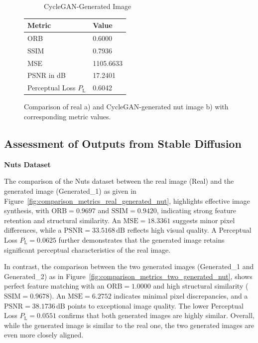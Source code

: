 \documentclass[12pt,DIV14,BCOR12mm,a4paper,footinclude=false,headinclude,parskip=half-,twoside,openright,cleardoublepage=empty,toc=index,bibliography=totoc,listof=totoc]{scrreprt}
\numberwithin{equation}{chapter}
\begin{document}
\begin{figure}
\begin{minipage}[H]{\linewidth}
\begin{minipage}[H]{0.5\linewidth}
\begin{subfigure}[t]{0.48\linewidth}
                \caption{CycleGAN-Generated Image}
            \end{subfigure}
        \end{minipage}%
        \hfill
        \begin{minipage}[H]{0.5\linewidth} %
            \centering
            \small
            \begin{tabular}{p{3cm} p{2cm}}
                \toprule
                \textbf{Metric} & \textbf{Value} \\ 
                \midrule
                ORB             & 0.6000        \\ 
                SSIM            & 0.7936        \\ 
                MSE             & 1105.6633     \\ 
                PSNR in dB      & 17.2401       \\ 
                Perceptual Loss \( P_{\text{L}} \)  & 0.6042        \\ 
                \bottomrule
            \end{tabular}
        \end{minipage}%
        \caption{Comparison of real a) and CycleGAN-generated nut image b) with corresponding metric values.}
        \label{fig:comparison_metrics_real_generated_nut_cycleGAN}
    \end{minipage}
\end{figure}

\subsection{Assessment of Outputs from Stable Diffusion}

\textbf{Nuts Dataset}

The comparison of the Nuts dataset between the real image (Real) and the generated image (Generated\_1) as given in Figure~\ref{fig:comparison_metrics_real_generated_nut}, highlights effective image synthesis, with $\text{ORB} = 0.9697$ and $\text{SSIM} = 0.9420$, indicating strong feature retention and structural similarity. An $\text{MSE} = 18.3361$ suggests minor pixel differences, while a $\text{PSNR} = 33.5168\,\mathrm{dB}$ reflects high visual quality. A Perceptual Loss \( P_{\text{L}} = 0.0625 \) further demonstrates that the generated image retains significant perceptual characteristics of the real image.

In contrast, the comparison between the two generated images (Generated\_1 and Generated\_2) as in Figure~\ref{fig:comparison_metrics_two_generated_nut}, shows perfect feature matching with an $\text{ORB} = 1.0000$ and high structural similarity ($\text{SSIM} = 0.9678$). An $\text{MSE} = 6.2752$ indicates minimal pixel discrepancies, and a $\text{PSNR} = 38.1736\,\mathrm{dB}$ points to exceptional image quality. The lower Perceptual Loss \( P_{\text{L}} = 0.0551 \) confirms that both generated images are highly similar. Overall, while the generated image is similar to the real one, the two generated images are even more closely aligned.
\end{document}
